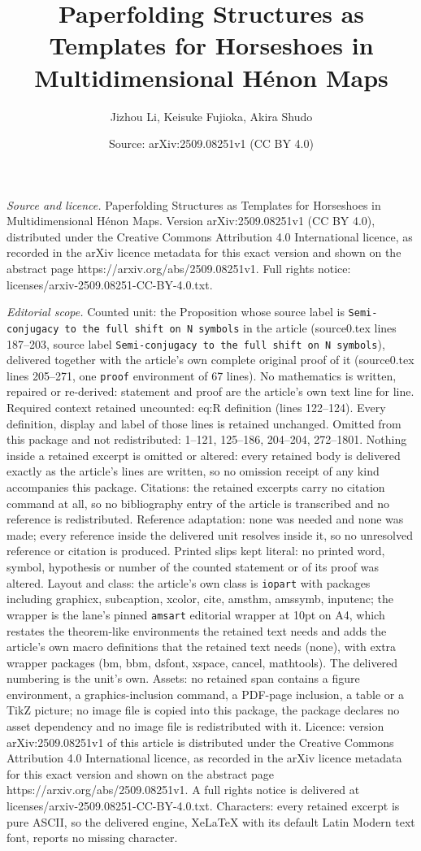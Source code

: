 \documentclass[10pt,a4paper]{amsart}
\title[Paperfolding Structures as Templates for Horseshoes in Multi]{Paperfolding Structures as Templates for Horseshoes in Multidimensional H\'enon Maps}
\author{Jizhou Li, Keisuke Fujioka, Akira Shudo}
\date{Source: arXiv:2509.08251v1 (CC BY 4.0)}
\begin{document}
\maketitle

\noindent\emph{Source and licence.} Paperfolding Structures as Templates for Horseshoes in Multidimensional H\'enon Maps. Version arXiv:2509.08251v1 (CC BY 4.0), distributed under the Creative Commons Attribution 4.0 International licence, as recorded in the arXiv licence metadata for this exact version and shown on the abstract page https://arxiv.org/abs/2509.08251v1. Full rights notice: licenses/arxiv-2509.08251-CC-BY-4.0.txt.\par\smallskip

\noindent\textit{Editorial scope.} Counted unit: the Proposition whose source label is \texttt{Semi-conjugacy to the full shift on N symbols} in the article (source0.tex lines 187--203, source label \texttt{Semi-conjugacy to the full shift on N symbols}), delivered together with the article's own complete original proof of it (source0.tex lines 205--271, one \texttt{proof} environment of 67 lines). No mathematics is written, repaired or re-derived: statement and proof are the article's own text line for line. Required context retained uncounted: eq:R definition (lines 122--124). Every definition, display and label of those lines is retained unchanged. Omitted from this package and not redistributed: 1--121, 125--186, 204--204, 272--1801. Nothing inside a retained excerpt is omitted or altered: every retained body is delivered exactly as the article's lines are written, so no omission receipt of any kind accompanies this package. Citations: the retained excerpts carry no citation command at all, so no bibliography entry of the article is transcribed and no reference is redistributed. Reference adaptation: none was needed and none was made; every reference inside the delivered unit resolves inside it, so no unresolved reference or citation is produced. Printed slips kept literal: no printed word, symbol, hypothesis or number of the counted statement or of its proof was altered. Layout and class: the article's own class is \texttt{iopart} with packages including graphicx, subcaption, xcolor, cite, amsthm, amssymb, inputenc; the wrapper is the lane's pinned \texttt{amsart} editorial wrapper at 10pt on A4, which restates the theorem-like environments the retained text needs and adds the article's own macro definitions that the retained text needs (none), with extra wrapper packages (bm, bbm, dsfont, xspace, cancel, mathtools). The delivered numbering is the unit's own. Assets: no retained span contains a figure environment, a graphics-inclusion command, a PDF-page inclusion, a table or a TikZ picture; no image file is copied into this package, the package declares no asset dependency and no image file is redistributed with it. Licence: version arXiv:2509.08251v1 of this article is distributed under the Creative Commons Attribution 4.0 International licence, as recorded in the arXiv licence metadata for this exact version and shown on the abstract page https://arxiv.org/abs/2509.08251v1. A full rights notice is delivered at licenses/arxiv-2509.08251-CC-BY-4.0.txt. Characters: every retained excerpt is pure ASCII, so the delivered engine, XeLaTeX with its default Latin Modern text font, reports no missing character.
\end{document}
